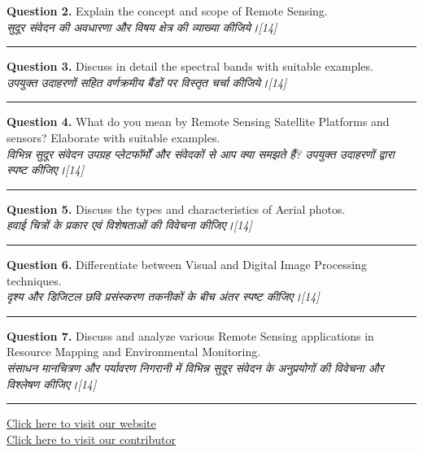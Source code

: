 \documentclass[11pt,a4paper]{article}
\newcommand{\pts}[1]{\hfill   \textit{[#1]}}
\begin{document}
\noindent   \textbf{Question 2.} Explain the concept and scope of Remote Sensing.\\
   \textit{सुदूर संवेदन की अवधारणा और विषय क्षेत्र की व्याख्या कीजिये।}\pts{14}

\medskip\rule{\linewidth}{0.2pt}\medskip




\noindent   \textbf{Question 3.} Discuss in detail the spectral bands with suitable examples.\\
   \textit{उपयुक्त उदाहरणों सहित वर्णक्रमीय बैंडों पर विस्तृत चर्चा कीजिये।}\pts{14}

\medskip\rule{\linewidth}{0.2pt}\medskip




\noindent   \textbf{Question 4.} What do you mean by Remote Sensing Satellite Platforms and sensors? Elaborate with suitable examples.\\
   \textit{विभिन्न सुदूर संवेदन उपग्रह प्लेटफॉर्मों और संवेदकों से आप क्या समझते हैं? उपयुक्त उदाहरणों द्वारा स्पष्ट कीजिए।}\pts{14}

\medskip\rule{\linewidth}{0.2pt}\medskip




\noindent   \textbf{Question 5.} Discuss the types and characteristics of Aerial photos.\\
   \textit{हवाई चित्रों के प्रकार एवं विशेषताओं की विवेचना कीजिए।}\pts{14}

\medskip\rule{\linewidth}{0.2pt}\medskip




\noindent   \textbf{Question 6.} Differentiate between Visual and Digital Image Processing techniques.\\
   \textit{दृश्य और डिजिटल छवि प्रसंस्करण तकनीकों के बीच अंतर स्पष्ट कीजिए।}\pts{14}

\medskip\rule{\linewidth}{0.2pt}\medskip




\noindent   \textbf{Question 7.} Discuss and analyze various Remote Sensing applications in Resource Mapping and Environmental Monitoring.\\
   \textit{संसाधन मानचित्रण और पर्यावरण निगरानी में विभिन्न सुदूर संवेदन के अनुप्रयोगों की विवेचना और विश्लेषण कीजिए।}\pts{14}

\vfill
\rule{\linewidth}{0.4pt}

\begin{center}\small
\href{https://bhu-exam.vercel.app/}{Click here to visit our website}\\[4pt]
\href{https://me-aryan.vercel.app/}{Click here to visit our contributor}
\end{center}
\end{document}
